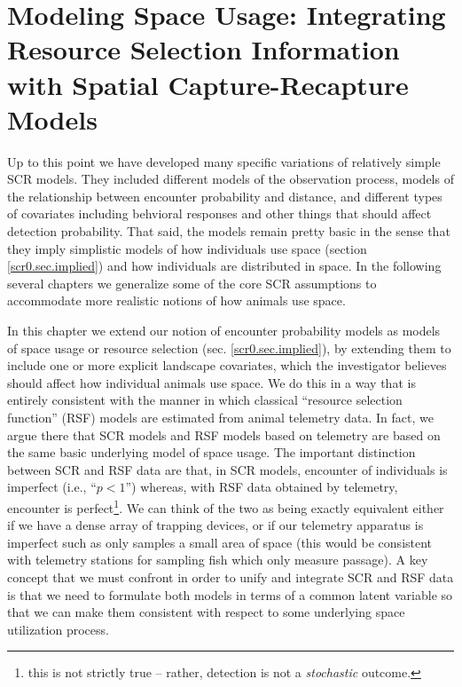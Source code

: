 \chapter{
Modeling Space Usage:
Integrating Resource Selection Information with
Spatial Capture-Recapture
  Models}

\label{chapt.rsf}


\vspace{.3in}

Up to this point we have developed many specific variations of
relatively simple SCR models. They included different models of the
observation process, models of the relationship between encounter
probability and distance, and different types of covariates including
behvioral responses and other things that should affect detection
probability.  That said, the models remain pretty basic in the sense
that they imply simplistic models of how individuals use space
(section \ref{scr0.sec.implied}) and how individuals are distributed
in space.  In the following several chapters we generalize some of the
core SCR assumptions to accommodate more realistic notions of how
animals use space.

In this chapter we extend our notion of encounter probability models
as models of space usage or resource selection
(sec. \ref{scr0.sec.implied}), by extending them to include one or
more explicit landscape covariates, which the investigator believes
should affect how individual animals use space. We do this in a way
that is entirely consistent with the manner in which classical
``resource selection function'' (RSF) models are estimated from animal
telemetry data.  In fact, we argue there that SCR models and RSF
models based on telemetry are based on the same basic underlying model
of space usage. The important distinction between SCR and RSF data are
that, in SCR models, encounter of individuals is imperfect (i.e.,
``$p<1$'') whereas, with RSF data obtained by telemetry, encounter is
perfect\footnote{this is not strictly true -- rather, detection is not
  a {\it stochastic} outcome.}. We can think of the two as being
exactly equivalent either if we have a dense array of trapping
devices, or if our telemetry apparatus is imperfect such as only
samples a small area of space (this would be consistent with telemetry
stations for sampling fish which only measure passage).  A key concept
that we must confront in order to unify and integrate SCR and RSF data
is that we need to formulate both models in terms of a common latent
variable so that we can make them consistent with respect to some
underlying space utilization process.


